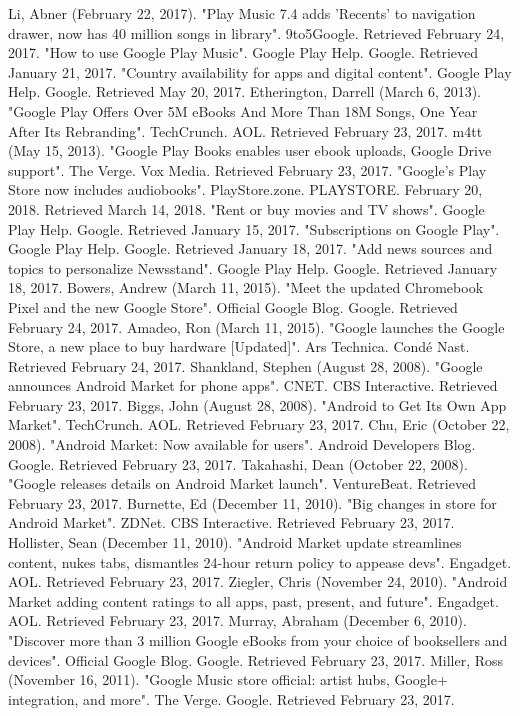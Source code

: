 \documentclass{article}                    %
\begin{document}
Li, Abner (February 22, 2017). "Play Music 7.4 adds 'Recents' to navigation drawer, now has 40 million songs in library". 9to5Google. Retrieved February 24, 2017.
"How to use Google Play Music". Google Play Help. Google. Retrieved January 21, 2017.
"Country availability for apps and digital content". Google Play Help. Google. Retrieved May 20, 2017.
Etherington, Darrell (March 6, 2013). "Google Play Offers Over 5M eBooks And More Than 18M Songs, One Year After Its Rebranding". TechCrunch. AOL. Retrieved February 23, 2017.
m4tt (May 15, 2013). "Google Play Books enables user ebook uploads, Google Drive support". The Verge. Vox Media. Retrieved February 23, 2017.
"Google's Play Store now includes audiobooks". PlayStore.zone. PLAYSTORE. February 20, 2018. Retrieved March 14, 2018.
"Rent or buy movies and TV shows". Google Play Help. Google. Retrieved January 15, 2017.
"Subscriptions on Google Play". Google Play Help. Google. Retrieved January 18, 2017.
"Add news sources and topics to personalize Newsstand". Google Play Help. Google. Retrieved January 18, 2017.
Bowers, Andrew (March 11, 2015). "Meet the updated Chromebook Pixel and the new Google Store". Official Google Blog. Google. Retrieved February 24, 2017.
Amadeo, Ron (March 11, 2015). "Google launches the Google Store, a new place to buy hardware [Updated]". Ars Technica. Condé Nast. Retrieved February 24, 2017.
Shankland, Stephen (August 28, 2008). "Google announces Android Market for phone apps". CNET. CBS Interactive. Retrieved February 23, 2017.
Biggs, John (August 28, 2008). "Android to Get Its Own App Market". TechCrunch. AOL. Retrieved February 23, 2017.
Chu, Eric (October 22, 2008). "Android Market: Now available for users". Android Developers Blog. Google. Retrieved February 23, 2017.
Takahashi, Dean (October 22, 2008). "Google releases details on Android Market launch". VentureBeat. Retrieved February 23, 2017.
Burnette, Ed (December 11, 2010). "Big changes in store for Android Market". ZDNet. CBS Interactive. Retrieved February 23, 2017.
Hollister, Sean (December 11, 2010). "Android Market update streamlines content, nukes tabs, dismantles 24-hour return policy to appease devs". Engadget. AOL. Retrieved February 23, 2017.
Ziegler, Chris (November 24, 2010). "Android Market adding content ratings to all apps, past, present, and future". Engadget. AOL. Retrieved February 23, 2017.
Murray, Abraham (December 6, 2010). "Discover more than 3 million Google eBooks from your choice of booksellers and devices". Official Google Blog. Google. Retrieved February 23, 2017.
Miller, Ross (November 16, 2011). "Google Music store official: artist hubs, Google+ integration, and more". The Verge. Google. Retrieved February 23, 2017.
\end{document}
